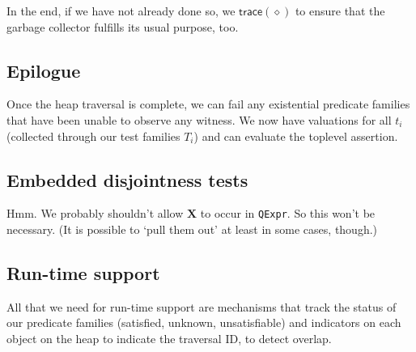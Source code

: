 \documentclass{report}
\newcommand{\disjointOp}{\ensuremath{\mathbf{X}}}
\newcommand{\TTtrace}{\textsf{trace}}
\newcommand{\roots}{\ensuremath{\diamond}}
\begin{document}
In the end, if we have not already done so, we $\TTtrace(\roots)$ to
ensure that the garbage collector fulfills its usual purpose, too.

\subsection{Epilogue}

Once the heap traversal is complete, we can fail any existential
predicate families that have been unable to observe any witness.  We
now have valuations for all $t_i$ (collected through our test families
$T_i$) and can evaluate the toplevel assertion.

\subsection{Embedded disjointness tests}\label{sec:embedded-disjointness}

Hmm.  We probably shouldn't allow $\disjointOp$ to occur in
\texttt{QExpr}.  So this won't be necessary.  (It is possible to `pull
them out' at least in some cases, though.)

\subsection{Run-time support}

All that we need for run-time support are mechanisms that track the
status of our predicate families (satisfied, unknown, unsatisfiable)
and indicators on each object on the heap to indicate the traversal
ID, to detect overlap.
\end{document}
